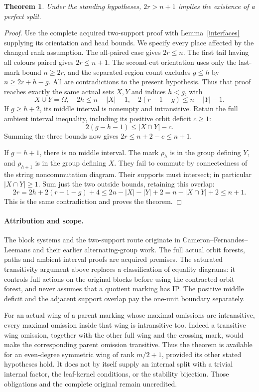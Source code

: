 \documentclass[11pt,a4paper]{article}
\newtheorem{theorem}[lemma]{Theorem}
\begin{document}
\begin{theorem}\label{boundary}
Under the standing hypotheses, $2r>n+1$ implies the existence
of a perfect split.
\end{theorem}
\begin{proof}
Use the complete acquired two-support proof with
Lemma~\ref{interfaces} supplying its orientation and head
bounds. We specify every place affected by the changed
rank assumption. The all-paired case gives $2r\le n$.
The first tail having all colours paired gives $2r\le n+1$.
The second-cut orientation uses only the last-mark bound
$n\ge2r$, and the separated-region count excludes $g\le h$
by $n\ge2r+h-g$. All are contradictions to the present
hypothesis. Thus that proof reaches exactly the same actual
sets $X,Y$ and indices $h<g$, with
\[
 X\cup Y=\Omega,\quad 2h\le n-|X|-1,\quad
 2(r-1-g)\le n-|Y|-1.
\]
If $g\ge h+2$, its middle interval is nonempty and
intransitive. Retain the full ambient interval inequality,
including its positive orbit deficit $c\ge1$:
\[
 2(g-h-1)\le |X\cap Y|-c.
\]
Summing the three bounds now gives $2r\le n+2-c\le n+1$.

If $g=h+1$, there is no middle interval. The mark $\rho_h$
is in the group defining $Y$, and $\rho_{h+1}$ is in the
group defining $X$. They fail to commute by connectedness
of the string noncommutation diagram. Their supports must
intersect; in particular $|X\cap Y|\ge1$. Sum just the
two outside bounds, retaining this overlap:
\[
 2r=2h+2(r-1-g)+4
 \le 2n-|X|-|Y|+2
 =n-|X\cap Y|+2\le n+1.
\]
This is the same contradiction and proves the theorem.
\end{proof}

\paragraph{Attribution and scope.}
The block systems and the two-support route originate in
Cameron--Fernandes--Leemans and their earlier alternating-group
work. The full actual orbit forests, paths and ambient interval
proofs are acquired premises. The saturated transitivity
argument above replaces a classification of equality diagrams:
it controls full actions on the original blocks before using
the contracted orbit forest, and never assumes that a quotient
marking has IP. The positive middle deficit and the adjacent
support overlap pay the one-unit boundary separately.

For an actual wing of a parent marking whose maximal omissions
are intransitive, every maximal omission inside that wing is
intransitive too. Indeed a transitive wing omission, together
with the other full wing and the crossing mark, would make the
corresponding parent omission transitive. Thus the theorem is
available for an even-degree symmetric wing of rank $m/2+1$,
provided its other stated hypotheses hold. It does not by itself
supply an internal split with a trivial internal factor, the
leaf-kernel conditions, or the stability bijection. Those
obligations and the complete original remain uncredited.
\end{document}

